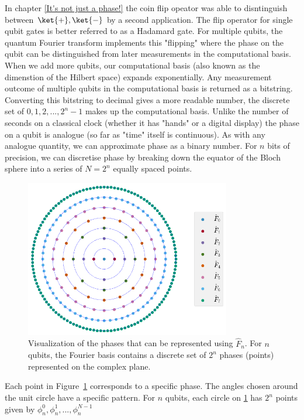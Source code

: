\documentclass{book}
\begin{document}
In chapter \ref{It's not just a phase!} the coin flip opeator was able to disntinguish between $\ket{+},\ket{-} $ by a second application. The flip operator for single qubit gates is better referred to as a Hadamard gate. For multiple qubits, the quantum Fourier transform implements this "flipping" where the phase on the qubit can be distinguished from later measurements in the computational basis. When we add more qubits, our computational basis (also known as the dimenstion of the Hilbert space) expands exponentially. Any measurement outcome of multiple qubits in the computational basis is returned as a bitstring. Converting this bitstring to decimal gives a more readable number, the discrete set of $0,1,2,...,2^n-1$ makes up the computational basis. Unlike the number of seconds on a classical clock (whether it has "hands" or a digital display) the phase on a qubit is analogue (so far as "time" itself is continuous). As with any analogue quantity, we can approximate phase as a binary number. For $n$ bits of precision, we can discretise phase by breaking down the equator of the Bloch sphere into a series of $N = 2^n$ equally spaced points. 

\begin{figure}[ht!]
    \centering
    \includegraphics[width=0.8\textwidth]{images/f_7_indices.png}
    \caption{Visualization of the phases that can be represented using $\hat{F}_n$. For $n$ qubits, the Fourier basis contains a discrete set of $2^n$ phases (points) represented on the complex plane.}
    \label{fig:f7_indices}
\end{figure}
 
Each point in Figure~\ref{fig:f7_indices} corresponds to a specific phase. The angles chosen around the unit circle have a specific pattern. For $n$ qubits, each circle on \ref{fig:f7_indices} has $2^n$ points given by $\phi_n^0,\phi_n^1, ..., \phi_n^{N-1} $ 
\end{document}
